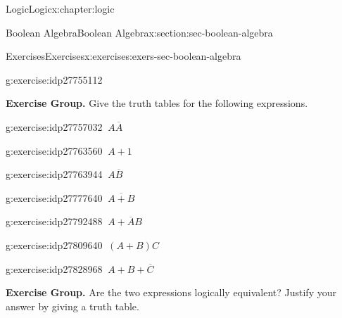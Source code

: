 \documentclass[twoside,10pt,]{book}
\numberwithin{equation}{section}
\begin{document}
\begin{chapterptx}{Logic}{}{Logic}{}{}{x:chapter:logic}
\begin{sectionptx}{Boolean Algebra}{}{Boolean Algebra}{}{}{x:section:sec-boolean-algebra}
\begin{exercises-subsection}{Exercises}{}{Exercises}{}{}{x:exercises:exers-sec-boolean-algebra}
\begin{exercisegroup}
\begin{divisionexerciseeg}{17}{}{}{g:exercise:idp27755112}
\begin{image}{0.3}{0.4}{0.3}%
%
\end{image}%
\end{divisionexerciseeg}%
\end{exercisegroup}
\par\medskip\noindent
\par\medskip\noindent%
\textbf{Exercise Group.}\space\space%
Give the truth tables for the following expressions.\begin{exercisegroup}
\begin{divisionexerciseeg}{18}{}{}{g:exercise:idp27757032}%
\(\ A\overline{A}\)\end{divisionexerciseeg}%
\begin{divisionexerciseeg}{19}{}{}{g:exercise:idp27763560}%
\(\ A+1\)\end{divisionexerciseeg}%
\begin{divisionexerciseeg}{20}{}{}{g:exercise:idp27763944}%
\(\ A\overline{B}\)\end{divisionexerciseeg}%
\begin{divisionexerciseeg}{21}{}{}{g:exercise:idp27777640}%
\(\ \overline{A+B}\)\end{divisionexerciseeg}%
\begin{divisionexerciseeg}{22}{}{}{g:exercise:idp27792488}%
\(\ A+\overline{A}{}B\)\end{divisionexerciseeg}%
\begin{divisionexerciseeg}{23}{}{}{g:exercise:idp27809640}%
\(\ (A+B)C\)\end{divisionexerciseeg}%
\begin{divisionexerciseeg}{24}{}{}{g:exercise:idp27828968}%
\(\ A+B+\overline{C}\)\end{divisionexerciseeg}%
\end{exercisegroup}
\par\medskip\noindent
\par\medskip\noindent%
\textbf{Exercise Group.}\space\space%
Are the two expressions logically equivalent?  Justify your answer by giving a truth table.\begin{exercisegroup}

\end{exercisegroup}
\end{exercises-subsection}
\end{sectionptx}
\end{chapterptx}
\end{document}

